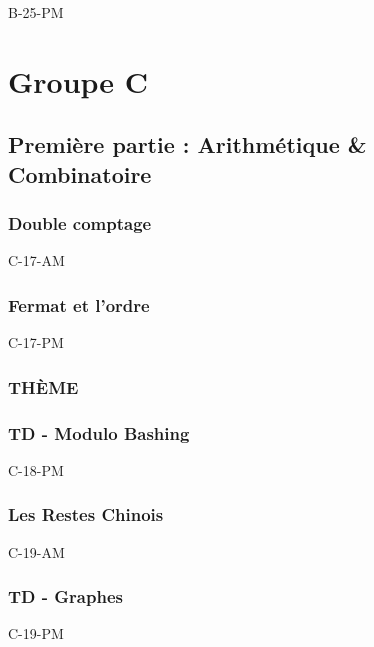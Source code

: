 \documentclass[poly,trombi]{valbonne}
\begin{document}
{B-25-PM}






\chapter{Groupe C}

\minitoc \clearpage

\section{Première partie : Arithmétique \& Combinatoire}

\subsection{Double comptage}

{C-17-AM}

\subsection{Fermat et l'ordre}

{C-17-PM}

\subsection{THÈME}


\subsection{TD - Modulo Bashing}

{C-18-PM}

\subsection{Les Restes Chinois}

{C-19-AM}

\subsection{TD - Graphes}

{C-19-PM}
\end{document}
